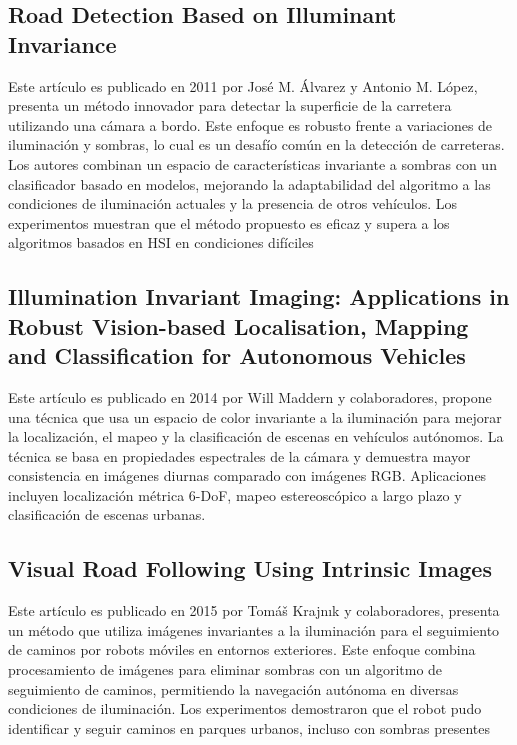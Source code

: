 \subsection{Road Detection Based on Illuminant Invariance}\label{alvarez-1}

Este artículo es publicado en 2011 por José M. Álvarez y Antonio M. López, presenta un método innovador para detectar la superficie de la carretera utilizando una cámara a bordo. Este enfoque es robusto frente a variaciones de iluminación y sombras, lo cual es un desafío común en la detección de carreteras. Los autores combinan un espacio de características invariante a sombras con un clasificador basado en modelos, mejorando la adaptabilidad del algoritmo a las condiciones de iluminación actuales y la presencia de otros vehículos. Los experimentos muestran que el método propuesto es eficaz y supera a los algoritmos basados en HSI en condiciones difíciles

\subsection{Illumination Invariant Imaging: Applications in Robust Vision-based Localisation, Mapping and Classification for Autonomous Vehicles}\label{maddern-1}

Este artículo es publicado en 2014 por Will Maddern y colaboradores, propone una técnica que usa un espacio de color invariante a la iluminación para mejorar la localización, el mapeo y la clasificación de escenas en vehículos autónomos. La técnica se basa en propiedades espectrales de la cámara y demuestra mayor consistencia en imágenes diurnas comparado con imágenes RGB. Aplicaciones incluyen localización métrica 6-DoF, mapeo estereoscópico a largo plazo y clasificación de escenas urbanas.

\subsection{Visual Road Following Using Intrinsic Images}\label{krejnik-1}

Este artículo es publicado en 2015 por Tomáš Krajnık y colaboradores, presenta un método que utiliza imágenes invariantes a la iluminación para el seguimiento de caminos por robots móviles en entornos exteriores. Este enfoque combina procesamiento de imágenes para eliminar sombras con un algoritmo de seguimiento de caminos, permitiendo la navegación autónoma en diversas condiciones de iluminación. Los experimentos demostraron que el robot pudo identificar y seguir caminos en parques urbanos, incluso con sombras presentes

